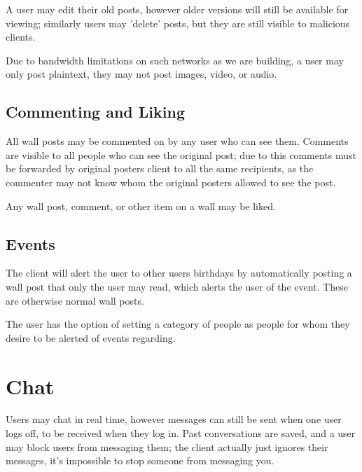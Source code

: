 A user may edit their old posts, however older versions will still be available
for viewing; similarly users may 'delete' posts, but they are still visible to
malicious clients.

Due to bandwidth limitations on such networks as we are building, a user may
only post plaintext, they may not post images, video, or audio.

\subsection{Commenting and Liking}
All wall posts may be commented on by any user who can see them. Comments are
visible to all people who can see the original post; due to this comments must
be forwarded by original posters client to all the same recipients, as the
commenter may not know whom the original posters allowed to see the post.

Any wall post, comment, or other item on a wall may be liked.
    
\subsection{Events}
The client will alert the user to other users birthdays by automatically posting
a wall post that only the user may read, which alerts the user of the event.
These are otherwise normal wall posts.

The user has the option of setting a category of people as people for whom they
desire to be alerted of events regarding.

\section{Chat}
Users may chat in real time, however messages can still be sent when one user
logs off, to be received when they log in. Past conversations are saved, and a
user may block users from messaging them; the client actually just ignores their
messages, it's impossible to stop someone from messaging you.
